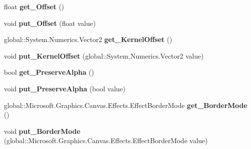 \begin{DoxyCompactItemize}
float {\bfseries get\+\_\+\+Offset} ()
\item 
\mbox{\label{class_microsoft_1_1_graphics_1_1_canvas_1_1_effects_1_1_convolve_matrix_effect_ac604eddf41c2e677eb1a7a1b392e3f1e}} 
void {\bfseries put\+\_\+\+Offset} (float value)
\item 
\mbox{\label{class_microsoft_1_1_graphics_1_1_canvas_1_1_effects_1_1_convolve_matrix_effect_a7955eb937e0401db75ec6dbd0121b0aa}} 
global\+::\+System.\+Numerics.\+Vector2 {\bfseries get\+\_\+\+Kernel\+Offset} ()
\item 
\mbox{\label{class_microsoft_1_1_graphics_1_1_canvas_1_1_effects_1_1_convolve_matrix_effect_a3a91dc58b0592464768418874a11cf46}} 
void {\bfseries put\+\_\+\+Kernel\+Offset} (global\+::\+System.\+Numerics.\+Vector2 value)
\item 
\mbox{\label{class_microsoft_1_1_graphics_1_1_canvas_1_1_effects_1_1_convolve_matrix_effect_a6c45f03f2bdf0174e804e97ef308a43c}} 
bool {\bfseries get\+\_\+\+Preserve\+Alpha} ()
\item 
\mbox{\label{class_microsoft_1_1_graphics_1_1_canvas_1_1_effects_1_1_convolve_matrix_effect_a7ff28376e85f7e4262710a6e5364f86b}} 
void {\bfseries put\+\_\+\+Preserve\+Alpha} (bool value)
\item 
\mbox{\label{class_microsoft_1_1_graphics_1_1_canvas_1_1_effects_1_1_convolve_matrix_effect_adbefe36f124d91b48f6852745d9d9481}} 
global\+::\+Microsoft.\+Graphics.\+Canvas.\+Effects.\+Effect\+Border\+Mode {\bfseries get\+\_\+\+Border\+Mode} ()
\item 
\mbox{\label{class_microsoft_1_1_graphics_1_1_canvas_1_1_effects_1_1_convolve_matrix_effect_ace47dc75de05d5c68030464a1c59cada}} 
void {\bfseries put\+\_\+\+Border\+Mode} (global\+::\+Microsoft.\+Graphics.\+Canvas.\+Effects.\+Effect\+Border\+Mode value)

\end{DoxyCompactItemize}
